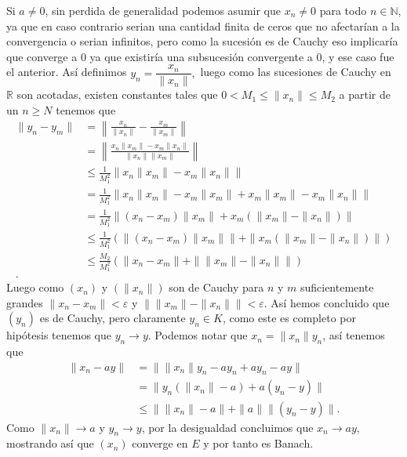 \begin{sproof}
  Si $a\neq 0$, sin perdida de generalidad podemos asumir que $x_n\neq 0$ para todo $n\in \mathbb{N}$, ya que en caso contrario serian una cantidad finita de ceros que no afectarían a la convergencia o serian infinitos, pero como la sucesión es de Cauchy eso implicaría que converge a $0$ ya que existiría una subsucesión convergente a $0$, y ese caso fue el anterior. Así definimos $y_n=\dfrac{x_n}{\|x_n\|},$ luego como las sucesiones de Cauchy en $\mathbb{R}$ son acotadas, existen constantes tales que $0<M_1\leq\|x_n\|\leq M_2$ a partir de un $n\geq N$ tenemos que   
  \begin{align*}
      \|y_n-y_m\|&=\left\|\frac{x_n}{\|x_n\|}-\frac{x_m}{\|x_m\|}\right\|\\
      &=\left\|\frac{x_n\|x_m\|-x_m\|x_n\|}{\|x_n\|\|x_m\|}\right\|\\
      &\leq\frac{1}{M_1^2}\|x_n\|x_m\|-x_m\|x_n\|\|\\
      &=\frac{1}{M_1^2}\|x_n\|x_m\|-x_m\|x_m\|+x_m\|x_m\|-x_m\|x_n\|\|\\
      &=\frac{1}{M_1^2}\|(x_n-x_m)\|x_m\|+x_m(\|x_m\|-\|x_n\|)\|\\
      &\leq\frac{1}{M_1^2}(\|(x_n-x_m)\|x_m\|\|+\|x_m(\|x_m\|-\|x_n\|)\|)\\
      &\leq\frac{M_2}{M_1^2}(\|x_n-x_m\|+\|\|x_m\|-\|x_n\|\|)\\
  .\end{align*}
  Luego como $(x_n)$ y $(\|x_n\|)$ son de Cauchy para $n$ y $m$ suficientemente grandes $\|x_n-x_m\|<\varepsilon$ y $\|\|x_m\|-\|x_n\|\|<\varepsilon.$ Así hemos concluido que $(y_n)$ es de Cauchy, pero claramente $y_n\in K$, como este es completo por hipótesis tenemos que $y_n\to y$. Podemos notar que $x_n=\|x_n\|y_n$, así tenemos que
  \begin{align*}
      \|x_n-ay\|&=\|\|x_n\|y_n-ay_n+ay_n-ay\|\\
      &=\|y_n(\|x_n\|-a)+a(y_n-y)\|\\
      &\leq\|\|x_n\|-a\|+\|a\|\|(y_n-y)\|
  .\end{align*}
  Como $\|x_n\|\to a$ y $y_n\to y$, por la desigualdad concluimos que $x_n\to ay,$ mostrando así que $(x_n)$ converge en $E$ y por tanto es Banach.

\end{sproof}